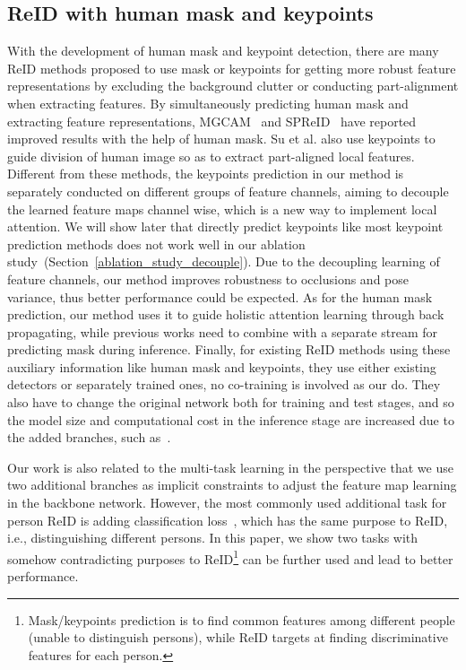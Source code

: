 \documentclass[10pt,twocolumn,letterpaper]{article}
\begin{document}
\subsection{ReID with human mask and keypoints} With the development of human mask and keypoint detection, there are many ReID methods proposed to use mask or keypoints for getting more robust feature representations by excluding the background clutter or conducting part-alignment when extracting features. By simultaneously predicting human mask and extracting feature representations, MGCAM~\cite{song2018mask} and SPReID~\cite{kalayeh2018human} have reported improved results with the help of human mask. Su et al.\cite{su2017pose} also use keypoints to guide division of human image so as to extract part-aligned local features. Different from these methods, the keypoints prediction in our method is separately conducted on different groups of feature channels, aiming to decouple the learned feature maps channel wise, which is a new way to implement local attention. We will show later that directly predict keypoints like most keypoint prediction methods does not work well in our ablation study~(Section~\ref{ablation_study_decouple}). Due to the decoupling learning of feature channels, our method improves robustness to occlusions and pose variance, thus better performance could be expected. As for the human mask prediction, our method uses it to guide holistic attention learning through back propagating, while previous works need to combine with a separate stream for predicting mask during inference. Finally, for existing ReID methods using these auxiliary information like human mask and keypoints, they use either existing detectors or separately trained ones, no co-training is involved as our do. They also have to change the original network both for training and test stages, and so the model size and computational cost in the inference stage are increased due to the added branches, such as~\cite{kalayeh2018human,song2018mask,wang2018mancs}.


Our work is also related to the multi-task learning in the perspective that we use two additional branches as implicit constraints to adjust the feature map learning in the backbone network. However, the most commonly used additional task for person ReID is adding classification loss~\cite{wang2018mancs,wang2018learning,zheng2019pyramidal}, which has the same purpose to ReID, i.e., distinguishing different persons. In this paper, we show two tasks with somehow contradicting purposes to ReID\footnote{Mask/keypoints prediction is to find common features among different people (unable to distinguish persons), while ReID targets at finding discriminative features for each person.} can be further used and lead to better performance. 
\end{document}
